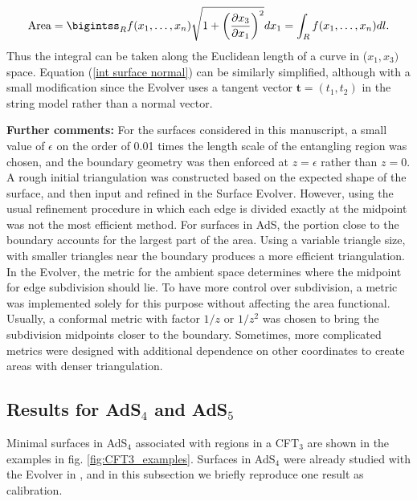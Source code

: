 \documentclass[11 pt]{article}
\begin{document}
\begin{equation}
    \text{Area} = \bigintss_R f(x_1,\ldots,x_n) \sqrt{1 + \left(\frac{\partial x_3}{\partial x_1}\right)^2} dx_1 = \int_R f(x_1,\ldots,x_n) dl.
\end{equation}
Thus the integral can be taken along the Euclidean length of a curve in ($x_1,x_3)$ space. Equation (\ref{int surface normal}) can be similarly simplified, although with a small modification since the Evolver uses a tangent vector $\mathbf{t}=(t_1, t_2)$ in the string model rather than a normal vector.

\bigskip
{\bf Further comments:}
For the surfaces considered in this manuscript, a small value of $\epsilon$ on the order of 0.01 times the length scale of the entangling region was chosen, and the boundary geometry was then enforced at $z=\epsilon$ rather than $z=0$. A rough initial triangulation was constructed based on the expected shape of the surface, and then input and refined in the Surface Evolver. However, using the usual refinement procedure in which each edge is divided exactly at the midpoint was not the most efficient method. For surfaces in AdS, the portion close to the boundary accounts for the largest part of the area. Using a variable triangle size, with smaller triangles near the boundary produces a more efficient triangulation. In the Evolver, the metric for the ambient space determines where the midpoint for edge subdivision should lie. To have more control over subdivision, a metric was implemented solely for this purpose without affecting the area functional. Usually, a conformal metric with factor $1/z$ or $1/z^2$ was chosen to bring the subdivision midpoints closer to the boundary. Sometimes, more complicated metrics were designed with additional dependence on other coordinates to create areas with denser triangulation.

\subsection{Results for AdS$_4$ and AdS$_5$}\label{app:AdS4}
Minimal surfaces in AdS$_4$ associated with regions in a CFT$_3$ are shown in the examples in fig. \ref{fig:CFT3_examples}. Surfaces in AdS$_4$ were already studied with the Evolver in \cite{Fonda2015}, and in this subsection we briefly reproduce one result as calibration.
\end{document}
